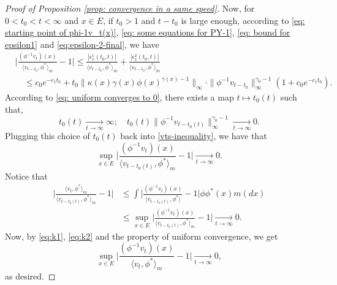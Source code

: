 \documentclass[12pt, a4paper]{amsart}
\theoremstyle{definition}
\numberwithin{equation}{section}
\begin{document}
\begin{proof}[Proof of Proposition \ref{prop: convergence in a same speed}]
	Now, for $0<t_0<t<\infty$ and $x\in E$, if $t_0 > 1$ and $t-t_0$ is large enough, according to \eqref{eq: starting point of phi-1v_t(x)}, \eqref{eq: some equations for PY-1}, \eqref{eq: bound for epsilon1} and \eqref{eq:epsilon-2-final}, we have
\begin{equation}\label{vts-inequality}\begin{split}
	&\Big|\frac{(\phi^{-1}v_t)(x)}{\langle v_{t-t_0},\phi^* \rangle_m}-1 \Big|
	\leq \frac{|\epsilon_x^1(t_0,t)|}{\langle v_{t-t_0},\phi^* \rangle_m} + \frac{|\epsilon_x^2(t_0,t)|}{\langle v_{t-t_0},\phi^* \rangle_m}\\
	&\quad \leq c_0e^{-c_1 t_0} +t_0\|\kappa(x)\gamma(x)\phi(x)^{\gamma(x) - 1}\|_{\infty}
	\cdot \|\phi^{-1}v_{t-t_0}\|^{\gamma_0-1}_\infty (1+c_0 e^{-c_1 t_0}).
\end{split}\end{equation}
	According to \eqref{eq: uniform converges to 0}, there exists a map $t\mapsto t_0(t)$ such that,
\begin{equation}
	t_0(t)
	\xrightarrow[t\to\infty]{} \infty;
	\quad t_0(t)\| \phi^{-1}v_{t-t_0(t)}\|^{\gamma_0 - 1}_\infty
	\xrightarrow[t\to\infty]{} 0.
\end{equation}
	Plugging this choice of $t_0(t)$ back into \eqref{vts-inequality}, we have that
\begin{equation}\label{eq:k1}
	\sup_{x\in E}\Big|\frac{(\phi^{-1}v_t)(x)}{\langle v_{t-t_0(t)},\phi^* \rangle_m}-1 \Big|
	\xrightarrow[t\to\infty]{} 0.
\end{equation}
	Notice that
\begin{equation}\label{eq:k2}\begin{split}
	\Big |\frac {\langle v_t, \phi^*\rangle_m} {\langle v_{t-t_0(t)} , \phi^*\rangle_m} - 1 \Big |
	&\leq \int \Big | \frac{(\phi^{-1}v_t)(x)}{\langle v_{t-t_0(t)} , \phi^*\rangle} - 1 \Big| \phi \phi^*(x) m(dx)\\
	&\leq \sup_{x\in E}\Big|\frac{(\phi^{-1}v_t)(x)}{\langle v_{t-t_0(t)},\phi^* \rangle_m}-1 \Big|
	\xrightarrow[t\to\infty]{} 0.
\end{split}\end{equation}
	Now, by \eqref{eq:k1}, \eqref{eq:k2} and the property of uniform convergence, we get
\begin{equation}
	\sup_{x\in E}\Big|\frac{(\phi^{-1}v_t)(x)}{\langle v_{t},\phi^* \rangle_m}-1 \Big|
	\xrightarrow[t\to\infty]{} 0,
\end{equation}
	as desired.
\end{proof}
\end{document}
